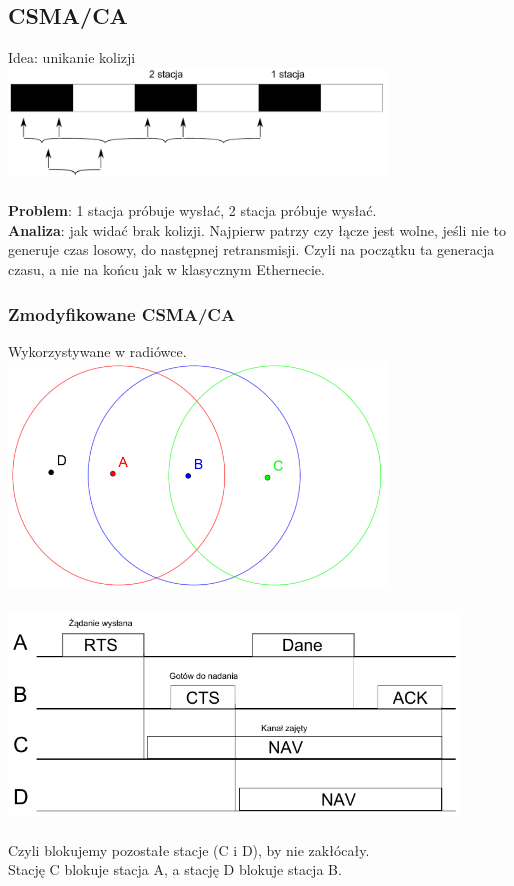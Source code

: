 \documentclass[a4paper,twoside]{article}
\begin{document}
	\subsection{CSMA/CA}
		Idea: unikanie kolizji\\
		\includegraphics[width=10cm]{./images/image22.pdf}\\\\
		\textbf{Problem}: 1 stacja próbuje wysłać, 2 stacja próbuje wysłać.\\
		\textbf{Analiza}: jak widać brak kolizji. Najpierw patrzy czy łącze jest wolne, jeśli nie to generuje czas losowy, do następnej retransmisji. Czyli na początku ta generacja czasu, a nie na końcu jak w klasycznym Ethernecie.
	\subsubsection{Zmodyfikowane CSMA/CA}
		Wykorzystywane w radiówce.\\
		\includegraphics[width=10cm]{./images/image23.pdf}\\\\
		\includegraphics[width=12cm]{./images/image24.pdf}\\\\
		Czyli blokujemy pozostałe stacje (C i D), by nie zakłócały.\\
		Stację C blokuje stacja A, a stację D blokuje stacja B.
\end{document}
